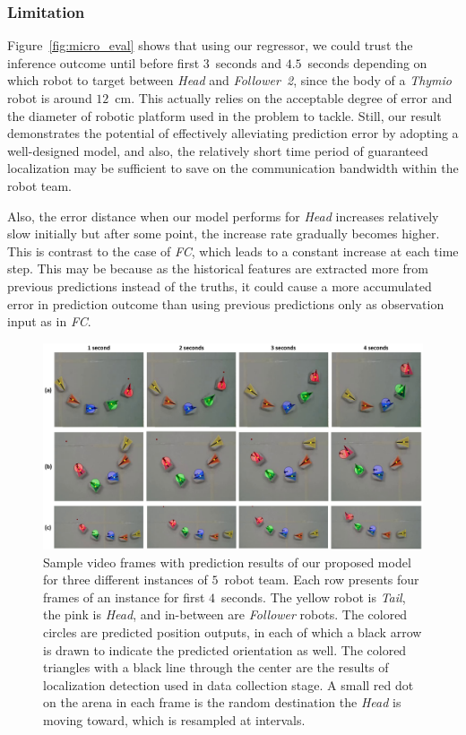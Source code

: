 \documentclass[letterpaper, 10 pt, conference]{ieeeconf}  %
\begin{document}
    \subsubsection{Limitation}
	\label{sec:limitation}

	Figure~\ref{fig:micro_eval} shows that using our regressor, we could trust the inference
	outcome until before first $3$~seconds and $4.5$~seconds depending on which robot to target between
	\emph{Head} and \emph{Follower~2}, since the body of a \emph{Thymio} robot is around
	$12$~cm. This actually relies on the acceptable degree of error and the diameter of
	robotic platform used in the problem to tackle. Still, our result demonstrates the potential
	of effectively alleviating prediction error by adopting a well-designed model, and also,
	the relatively short time period of guaranteed localization may be sufficient to
	save on the communication bandwidth within the robot team.

	Also, the error distance when our model performs for \emph{Head} increases relatively slow
	initially but after some point, the increase rate gradually becomes higher. This is contrast to the
	case of \emph{FC}, which leads to a constant increase at each time step.
	This may be because as the historical features are extracted more from previous predictions
	instead of the truths, it could cause a more accumulated error in prediction outcome than
	using previous predictions only as observation input as in \emph{FC}.

	\begin{figure}[t]
		\centering
		\includegraphics[width=2.\columnwidth]{fig_preds}
		\caption{Sample video frames with prediction results of our proposed model
			for three different instances of $5$~robot team.
			Each row presents four frames of an instance for first $4$~seconds.
			The yellow robot is \emph{Tail}, the pink is \emph{Head}, and
			in-between are \emph{Follower} robots.
			The colored circles are predicted position outputs, in each
			of which a black arrow is drawn to indicate the predicted orientation as well.
			The colored triangles with a black line through the center are the
			results of localization detection used in data collection stage.
			A small red dot on the arena in each frame is the random destination the
			\emph{Head} is moving toward, which is resampled at intervals.
		}
		\label{fig:preds}
	\end{figure}
\end{document}
